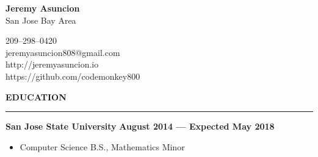 \documentclass[10pt, oneside]{letter}
\newcommand{\linespaceshit} {
    \vspace{0.05in}
    \hrule
    \vspace{0.05in}
}
\begin{document}
    \begin{minipage}[t]{11cm}
        \flushleft{}
        \textbf{Jeremy Asuncion} \\
        San Jose Bay Area \\
    \end{minipage}
    \begin{minipage}[t]{7cm}
        \flushright{}
        209--298--0420 \\
        jeremyasuncion808@gmail.com \\
        http://jeremyasuncion.io \\
        https://github.com/codemonkey800 \\
    \end{minipage}

    \vspace{0.1in}

    \textbf{EDUCATION}
    \linespaceshit
        \begin{adjustwidth}{0.1in}{0pt}
            \textbf{San Jose State University} \hfill \textbf{August 2014 --- Expected May 2018}
            \begin{itemize}
                \item Computer Science B.S., Mathematics Minor
            \end{itemize}
        \end{adjustwidth}
\end{document}

